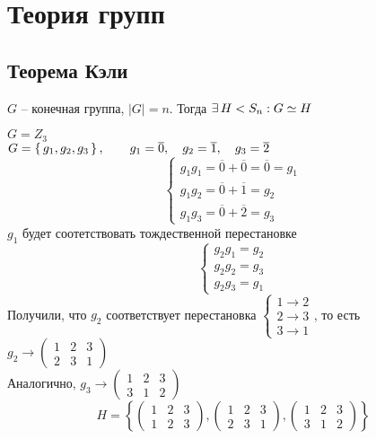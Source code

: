 \chapter{Теория групп}

\section{Теорема Кэли}

\begin{theorem}[Кэли]
	$ G $ -- конечная группа, $ |G| = n $. Тогда $ \exists\, H < S_n : G \simeq H $
\end{theorem}

\begin{eg}
	$ G = Z_3 $ \\
    $ G = \set{g_1, g_2, g_3}, \qquad g_1 = \overline{0}, \quad g_2 = \overline{1}, \quad g_3 = \overline{2} $
    $$
    \begin{cases}
        g_1g_1 = \overline{0} + \overline{0} = \overline{0} = g_1 \\
        g_1g_2 = \overline{0} + \overline{1} = g_2 \\
        g_1g_3 = \overline{0} + \overline{2} = g_3
    \end{cases} $$
    $ g_1 $ будет соотетствовать тождественной перестановке
    $$
    \begin{cases}
    	g_2g_1 = g_2 \\
        g_2g_2 = g_3 \\
        g_2g_3 = g_1
    \end{cases} $$
    Получили, что $ g_2 $ соответствует перестановка $
    \begin{cases}
    	1 \to 2 \\
        2 \to 3 \\
        3 \to 1
    \end{cases} $, то есть $ g_2 \to
    \begin{pmatrix}
    	1 & 2 & 3 \\
        2 & 3 & 1
    \end{pmatrix} $ \\
    Аналогично, $ g_3 \to
    \begin{pmatrix}
    	1 & 2 & 3 \\
        3 & 1 & 2
    \end{pmatrix} $
    $$ H = \left\{
        \begin{pmatrix}
        	1 & 2 & 3 \\
            1 & 2 & 3
        \end{pmatrix},
        \begin{pmatrix}
        	1 & 2 & 3 \\
            2 & 3 & 1
        \end{pmatrix},
        \begin{pmatrix}
        	1 & 2 & 3 \\
            3 & 1 & 2
        \end{pmatrix}
        \right\} $$
\end{eg}

